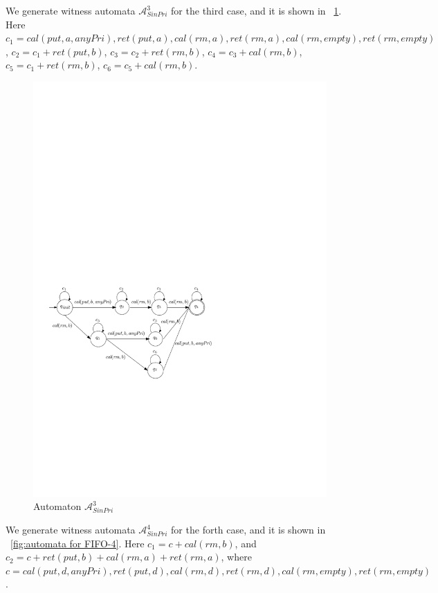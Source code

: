 We generate witness automata $\mathcal{A}_{\textit{SinPri}}^3$ for the third case, and it is shown in \figurename~\ref{fig:automata for FIFO-3}. Here $c_1 = \textit{cal}(\textit{put},a,\textit{anyPri}),\textit{ret}(\textit{put},a), \textit{cal}(\textit{rm},a),\textit{ret}(\textit{rm},a),\textit{cal}(\textit{rm},\textit{empty}),\textit{ret}(\textit{rm},\textit{empty})$, $c_2 = c_1 + \textit{ret}(\textit{put},b)$, $c_3 = c_2 + \textit{ret}(\textit{rm},b)$, $c_4 = c_3 + \textit{cal}(\textit{rm},b)$, $c_5 = c_1 + \textit{ret}(\textit{rm},b)$, $c_6 = c_5 + \textit{cal}(\textit{rm},b)$.

\begin{figure}[htbp]
  \centering
  \includegraphics[width=0.7 \textwidth]{figures/PIC_AUTO_FIFO_3.pdf}
  \caption{Automaton $\mathcal{A}_{\textit{SinPri}}^3$}
  \label{fig:automata for FIFO-3}
\end{figure}

We generate witness automata $\mathcal{A}_{\textit{SinPri}}^4$ for the forth case, and it is shown in \figurename~\ref{fig:automata for FIFO-4}. Here $c_1 = c + \textit{cal}(\textit{rm},b)$, and $c_2 = c + \textit{ret}(\textit{put},b) + \textit{cal}(\textit{rm},a) + \textit{ret}(\textit{rm},a)$, where $c = \textit{cal}(\textit{put},d,\textit{anyPri}),\textit{ret}(\textit{put},d), \textit{cal}(\textit{rm},d),\textit{ret}(\textit{rm},d),\textit{cal}(\textit{rm},\textit{empty}),\textit{ret}(\textit{rm},\textit{empty})$.

